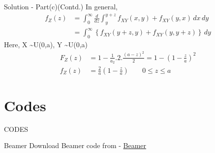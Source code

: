 \documentclass{beamer}
\providecommand{\brak}[1]{\ensuremath{\left(#1\right)}}
\providecommand{\cbrak}[1]{\ensuremath{\left\{#1\right\}}}
\begin{document}
\begin{frame}{Solution - Part(c)(Contd.)}
  In general, \\
  \begin{align}
      f_Z(z) &= \int_{0}^{\infty} \frac{d}{dz} \int_{y}^{y+z}f_{XY}(x,y)+ f_{XY}(y,x)\,dx \,dy \\
      &= \int_{0}^{\infty} \cbrak{f_{XY}(y+z,y)+ f_{XY}(y,y+z) } \,dy 
      \end{align}
Here, \;\;\;\;\;\;\;\;\;\;\;\;\;X \sim U(0,a), \;\;\;\;\; Y  \sim U(0,a) \\
\begin{align}
F_Z(z) &= 1 - \frac{1}{a_2}.2.\frac{(a-z)^2}{2} = 1 - \brak{1 - \frac{z}{a}}^2 \\
f_Z(z) &= \frac{2}{a}\brak{1 - \frac{z}{a}} \;\;\;\;\;\;\; 0 \le z \le a
\end{align}
    \end{frame}


\section{Codes}
\begin{frame}{CODES}
 \begin{block}{Beamer}
         Download Beamer code from - \href{https://github.com/Donal-08/Assignment10/blob/main/beamer_10.tex}{Beamer}
    \end{block}
\end{frame} 
\end{document}
